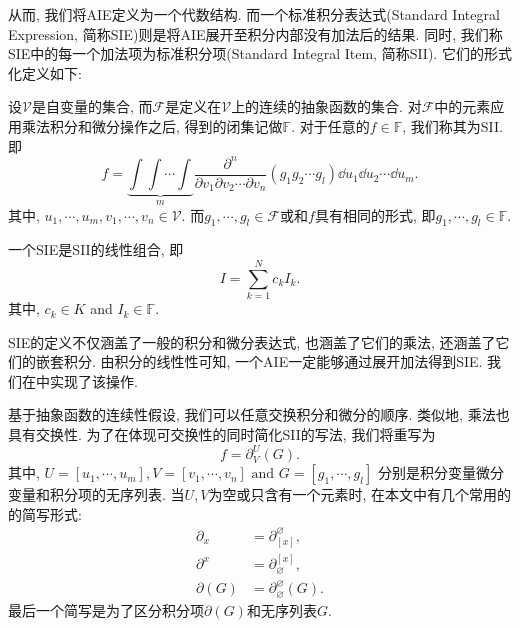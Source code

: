 从而, 我们将AIE定义为一个代数结构. 而一个标准积分表达式(Standard Integral Expression, 简称SIE)则是将AIE展开至积分内部没有加法后的结果. 同时, 我们称SIE中的每一个加法项为标准积分项(Standard Integral Item, 简称SII). 它们的形式化定义如下:
\begin{definition}
设$\mathcal V$是自变量的集合, 而$\mathcal F$是定义在$\mathcal V$上的连续的抽象函数的集合. 对$\mathcal F$中的元素应用乘法\D 积分和微分操作之后, 得到的闭集记做$\mathbb F$. 对于任意的$f\in\mathbb{F}$, 我们称其为SII. 即
\begin{equation} 
f =\underbrace{\int\!\int\!\cdots\!\int}_m{ \frac{\partial^n}{\partial v_1 \partial v_2 \cdots \partial v_n} (g_1 g_2 \cdots g_l)\dd u_1 \dd u_2 \cdots \dd u_m}.
\label{int_form}
\end{equation} 
其中, $u_1,\cdots,u_m,v_1,\cdots,v_n \in \mathcal V$. 而$g_1,\cdots,g_l \in \mathcal F$或和$f$具有相同的形式, 即$g_1,\cdots,g_l \in \mathbb F$.
\end{definition}

\begin{definition}
一个SIE是SII的线性组合, 即
\begin{equation}
I = \sum_{k=1}^N{c_k I_k}.
\label{std_form}
\end{equation} 
其中, $c_k \in K$ and $I_k \in \mathbb F$. 
\end{definition}

SIE的定义不仅涵盖了一般的积分和微分表达式, 也涵盖了它们的乘法, 还涵盖了它们的嵌套积分. 由积分的线性性可知, 一个AIE一定能够通过展开加法得到SIE. 我们在中实现了该操作. 

基于抽象函数的连续性假设, 我们可以任意交换积分和微分的顺序. 类似地, 乘法也具有交换性. 为了在体现可交换性的同时简化SII的写法, 我们将重写为
\begin{equation} 
f=\partial^U_V(G). \label{st_form}
\end{equation} 
其中,  $U=[u_1,\cdots,u_m], V=[v_1,\cdots,v_n] \text{~and~} G=[g_1,\cdots,g_l]$ 分别是积分变量\D 微分变量和积分项的无序列表. 当$U,V$为空或只含有一个元素时, 在本文中有几个常用的的简写形式:
\begin{equation}
\begin{split}
\partial_x&=\partial^\varnothing_{[x]},  \\
\partial^x&=\partial_\varnothing^{[x]},  \\ 
\partial(G)&=\partial^\varnothing_\varnothing(G).
\end{split}
\end{equation}
最后一个简写是为了区分积分项$\partial(G)$和无序列表$G$. 

